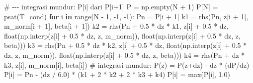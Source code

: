 \documentclass[
  indonesian,
  12pt,
  a4paper,
]{report}
\newenvironment{Shaded}{\begin{snugshade}}{\end{snugshade}}
\newcommand{\BuiltInTok}[1]{\textcolor[rgb]{0.00,0.23,0.31}{#1}}
\newcommand{\CommentTok}[1]{\textcolor[rgb]{0.37,0.37,0.37}{#1}}
\newcommand{\ControlFlowTok}[1]{\textcolor[rgb]{0.00,0.23,0.31}{\textbf{#1}}}
\newcommand{\DecValTok}[1]{\textcolor[rgb]{0.68,0.00,0.00}{#1}}
\newcommand{\FloatTok}[1]{\textcolor[rgb]{0.68,0.00,0.00}{#1}}
\newcommand{\KeywordTok}[1]{\textcolor[rgb]{0.00,0.23,0.31}{\textbf{#1}}}
\newcommand{\NormalTok}[1]{\textcolor[rgb]{0.00,0.23,0.31}{#1}}
\newcommand{\OperatorTok}[1]{\textcolor[rgb]{0.37,0.37,0.37}{#1}}
\begin{document}
\begin{Shaded}
\begin{Highlighting}[]
    \CommentTok{\# {-}{-}{-} integrasi mundur: P[i] dari P[i+1]}
\NormalTok{    P }\OperatorTok{=}\NormalTok{ np.empty(N }\OperatorTok{+} \DecValTok{1}\NormalTok{)}
\NormalTok{    P[N] }\OperatorTok{=}\NormalTok{ psat(T\_cond)}
    \ControlFlowTok{for}\NormalTok{ i }\KeywordTok{in} \BuiltInTok{range}\NormalTok{(N }\OperatorTok{{-}} \DecValTok{1}\NormalTok{, }\OperatorTok{{-}}\DecValTok{1}\NormalTok{, }\OperatorTok{{-}}\DecValTok{1}\NormalTok{):}
\NormalTok{        Pn }\OperatorTok{=}\NormalTok{ P[i }\OperatorTok{+} \DecValTok{1}\NormalTok{]}
\NormalTok{        k1 }\OperatorTok{=}\NormalTok{ rhs(Pn, z[i }\OperatorTok{+} \DecValTok{1}\NormalTok{], m\_norm[i }\OperatorTok{+} \DecValTok{1}\NormalTok{], beta[i }\OperatorTok{+} \DecValTok{1}\NormalTok{])}
\NormalTok{        k2 }\OperatorTok{=}\NormalTok{ rhs(Pn }\OperatorTok{+} \FloatTok{0.5} \OperatorTok{*}\NormalTok{ dz }\OperatorTok{*}\NormalTok{ k1, z[i] }\OperatorTok{+} \FloatTok{0.5} \OperatorTok{*}\NormalTok{ dz,}
                 \BuiltInTok{float}\NormalTok{(np.interp(z[i] }\OperatorTok{+} \FloatTok{0.5} \OperatorTok{*}\NormalTok{ dz, z, m\_norm)),}
                 \BuiltInTok{float}\NormalTok{(np.interp(z[i] }\OperatorTok{+} \FloatTok{0.5} \OperatorTok{*}\NormalTok{ dz, z, beta)))}
\NormalTok{        k3 }\OperatorTok{=}\NormalTok{ rhs(Pn }\OperatorTok{+} \FloatTok{0.5} \OperatorTok{*}\NormalTok{ dz }\OperatorTok{*}\NormalTok{ k2, z[i] }\OperatorTok{+} \FloatTok{0.5} \OperatorTok{*}\NormalTok{ dz,}
                 \BuiltInTok{float}\NormalTok{(np.interp(z[i] }\OperatorTok{+} \FloatTok{0.5} \OperatorTok{*}\NormalTok{ dz, z, m\_norm)),}
                 \BuiltInTok{float}\NormalTok{(np.interp(z[i] }\OperatorTok{+} \FloatTok{0.5} \OperatorTok{*}\NormalTok{ dz, z, beta)))}
\NormalTok{        k4 }\OperatorTok{=}\NormalTok{ rhs(Pn }\OperatorTok{+}\NormalTok{ dz }\OperatorTok{*}\NormalTok{ k3, z[i], m\_norm[i], beta[i])}
        \CommentTok{\# integrasi mundur: P(z) = P(z+dz) {-} dz * (dP/dz)}
\NormalTok{        P[i] }\OperatorTok{=}\NormalTok{ Pn }\OperatorTok{{-}}\NormalTok{ (dz }\OperatorTok{/} \FloatTok{6.0}\NormalTok{) }\OperatorTok{*}\NormalTok{ (k1 }\OperatorTok{+} \DecValTok{2} \OperatorTok{*}\NormalTok{ k2 }\OperatorTok{+} \DecValTok{2} \OperatorTok{*}\NormalTok{ k3 }\OperatorTok{+}\NormalTok{ k4)}
\NormalTok{        P[i] }\OperatorTok{=} \BuiltInTok{max}\NormalTok{(P[i], }\FloatTok{1.0}\NormalTok{)}


\end{Highlighting}
\end{Shaded}
\end{document}
